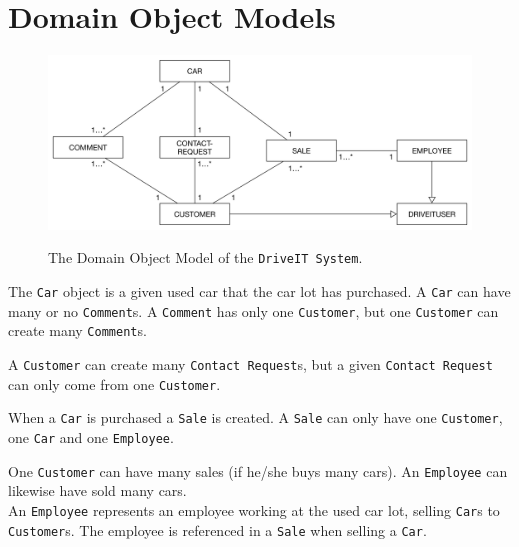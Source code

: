 \section{Domain Object Models}

\begin{figure}[H]
	\centering
		\includegraphics[width=\textwidth]{Figures/DomainObjectModel}\\
	\caption{The Domain Object Model of the \texttt{DriveIT System}.}
  \label{fig:DomainObjectModel}
\end{figure}

The \texttt{Car} object is a given used car that the car lot has purchased. A \texttt{Car} can have many or no \texttt{Comment}s. A \texttt{Comment} has only one \texttt{Customer}, but one \texttt{Customer} can create many \texttt{Comment}s.

A \texttt{Customer} can create many \texttt{Contact Request}s, but a given \texttt{Contact Request} can only come from one \texttt{Customer}.

When a  \texttt{Car} is purchased a \texttt{Sale} is created. A \texttt{Sale} can only have one \texttt{Customer}, one \texttt{Car} and one \texttt{Employee}.

One \texttt{Customer} can have many sales (if he/she buys many cars). An \texttt{Employee} can likewise have sold many cars.\\ 
An \texttt{Employee} represents an employee working at the used car lot, selling \texttt{Car}s to \texttt{Customer}s. The employee is referenced in a \texttt{Sale} when selling a \texttt{Car}.  